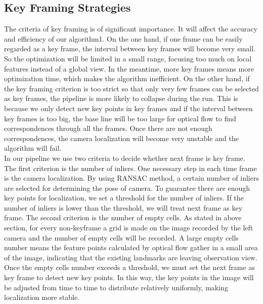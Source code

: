 \documentclass{easychair}
\begin{document}
\subsection{Key Framing Strategies}
The criteria of key framing is of significant importance. It will affect the accuracy and efficiency of our algorithm1. On the one hand, if one frame can be easily regarded as a key frame, the interval between key frames will become very small. So the optimization will be limited in a small range, focusing too much on local features instead of a global view. In the meantime, more key frames means more optimization time, which makes the algorithm inefficient. On the other hand, if the key framing criterion is too strict so that only very few frames can be selected as key frames, the pipeline is more likely to collapse during the run. This is because we only detect new key points in key frames and if the interval between key frames is too big, the base line will be too large for optical flow to find correspondences through all the frames. Once there are not enough correspondences, the camera localization will become very unstable and the algorithm will fail.\\

In our pipeline we use two criteria to decide whether next frame is key frame. The first criterion is the number of inliers. One necessary step in each time frame is the camera localization. By using RANSAC method, a certain number of inliers are selected for determining the pose of camera. To guarantee there are enough key points for localization, we set a threshold for the number of inliers. If the number of inliers is lower than the threshold, we will treat next frame as key frame. The second criterion is the number of empty cells. As stated in above section, for every non-keyframe a grid is made on the image recorded by the left camera and the number of empty cells will be recorded. A large empty cells number means the feature points calculated by optical flow gather in a small area of the image, indicating that the existing landmarks are leaving observation view. Once the empty cells number exceeds a threshold, we must set the next frame as key frame to detect new key points. In this way, the key points in the image will be adjusted from time to time to distribute relatively uniformly, making localization more stable.
\end{document}
